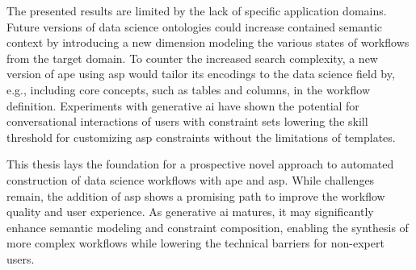 The presented results are limited by the lack of specific application domains. Future versions of data science ontologies could increase contained semantic context by introducing a new dimension modeling the various states of workflows from the target domain. To counter the increased search complexity, a new version of \ac{ape} using \ac{asp} would tailor its encodings to the data science field by, e.g., including core concepts, such as tables and columns, in the workflow definition. Experiments with generative \ac{ai} have shown the potential for conversational interactions of users with constraint sets lowering the skill threshold for customizing \ac{asp} constraints without the limitations of templates.

This thesis lays the foundation for a prospective novel approach to automated construction of data science workflows with \ac{ape} and \ac{asp}. While challenges remain, the addition of \ac{asp} shows a promising path to improve the workflow quality and user experience. As generative \ac{ai} matures, it may significantly enhance semantic modeling and constraint composition, enabling the synthesis of more complex workflows while lowering the technical barriers for non-expert users.
